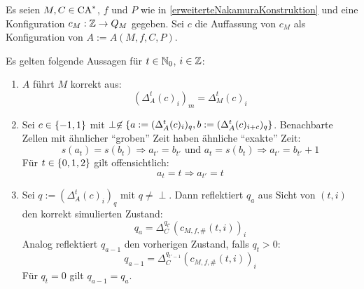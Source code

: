 \begin{satz}
    Es seien $M, C \in \textrm{CA}^*$, $f$ und $P$ wie in \cref{erweiterteNakamuraKonstruktion} und eine Konfiguration $c_M: \mathbb{Z} \to Q_M$ gegeben.
    Sei $c$ die Auffassung von $c_M$ als Konfiguration von $A := A(M, f, C, P)$.
    
    Es gelten folgende Aussagen für $t \in \mathbb{N}_0$, $i \in \mathbb{Z}$:
    
    \begin{enumerate}
        \item
            $A$ führt $M$ korrekt aus:
            \[
                (\Delta_A^t(c)_i)_m = \Delta_M^t(c)_i
            \]
        \item
            Sei $c \in \{ {-1, 1} \}$ mit $\perp \not \in \{ {a := (\Delta_A^t(c)_i)_q, b := (\Delta_A^t(c)_{i+c})_q} \}$.
            Benachbarte Zellen mit ähnlicher \enquote{groben} Zeit haben ähnliche \enquote{exakte} Zeit:
            \[
                s(a_{t}) = s(b_{t}) \Rightarrow a_{t'} = b_{t'} \text{ und }  a_{t} = s(b_{t}) \Rightarrow a_{t'} = b_{t'} + 1
            \]
            Für $t \in \{ {0, 1, 2} \}$ gilt offensichtlich:
            \[
                a_{t} = t \Rightarrow a_{t'} = t
            \]
        \item
            Sei $q := (\Delta_A^t(c)_i)_q$ mit $q \neq \perp$.
            Dann reflektiert $q_a$ aus Sicht von $(t, i)$ den korrekt simulierten Zustand:
            \[
                q_a = \Delta_C^{q_{t'}}(c_{M, f, \#}(t, i))_i
            \]
            Analog reflektiert $q_{a-1}$ den vorherigen Zustand, falls $q_t > 0$:
            \[
                q_{a-1} = \Delta_C^{q_{t' - 1}}(c_{M, f, \#}(t, i))_i
            \]
            Für $q_t = 0$ gilt $q_{a-1} = q_a$.
    \end{enumerate}
    
\end{satz}


